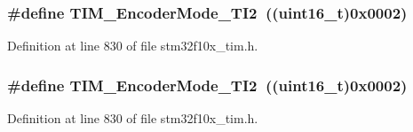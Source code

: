 \subsubsection[{\texorpdfstring{T\+I\+M\+\_\+\+Encoder\+Mode\+\_\+\+T\+I2}{TIM_EncoderMode_TI2}}]{\setlength{\rightskip}{0pt plus 5cm}\#define T\+I\+M\+\_\+\+Encoder\+Mode\+\_\+\+T\+I2~(({\bf uint16\+\_\+t})0x0002)}\hypertarget{group___t_i_m___encoder___mode_ga5627a2d5d47b7301c7dbb29d20ae00e3}{}\label{group___t_i_m___encoder___mode_ga5627a2d5d47b7301c7dbb29d20ae00e3}


Definition at line 830 of file stm32f10x\+\_\+tim.\+h.

\subsubsection[{\texorpdfstring{T\+I\+M\+\_\+\+Encoder\+Mode\+\_\+\+T\+I2}{TIM_EncoderMode_TI2}}]{\setlength{\rightskip}{0pt plus 5cm}\#define T\+I\+M\+\_\+\+Encoder\+Mode\+\_\+\+T\+I2~(({\bf uint16\+\_\+t})0x0002)}\hypertarget{group___t_i_m___encoder___mode_ga5627a2d5d47b7301c7dbb29d20ae00e3}{}\label{group___t_i_m___encoder___mode_ga5627a2d5d47b7301c7dbb29d20ae00e3}


Definition at line 830 of file stm32f10x\+\_\+tim.\+h.

